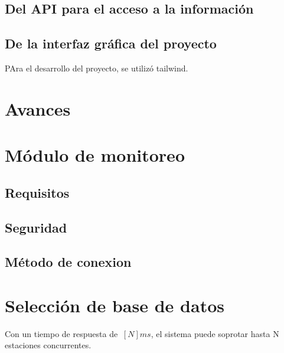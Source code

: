 \subsection{Del API para el acceso a la información}

\subsection{De la interfaz gráfica del proyecto}

PAra el desarrollo del proyecto, se utilizó tailwind.

\section{Avances}


\section{Módulo de monitoreo}

\subsection*{Requisitos}

\subsection*{Seguridad}

\subsection*{Método de conexion}



\section{Selección de base de datos}





Con un tiempo de respuesta de $~[N]ms$, el sistema puede soprotar hasta N estaciones concurrentes.

